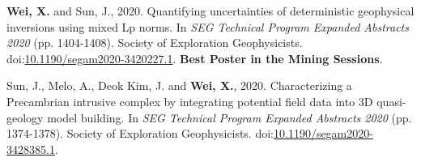 \documentclass[11pt, a4paper]{article}
\newcommand{\LastName}{Wei}
\newcommand{\Initials}{X}
\newcommand{\Wei}{\textbf{\LastName, \Initials.}}  %
\newcommand{\WeiSun}{\textbf{\LastName, \Initials.} and Sun, J.}  %
\newcommand{\DOI}[1]{doi:\href{https://doi.org/#1}{#1}}
\begin{document}
\begin{etaremune}
	\item
	\WeiSun, 2020. Quantifying uncertainties of deterministic geophysical inversions using mixed Lp norms. In \emph{SEG Technical Program Expanded Abstracts 2020} (pp. 1404-1408). Society of Exploration Geophysicists. \DOI{10.1190/segam2020-3420227.1}. \textbf{Best Poster in the Mining Sessions}.

	\item
	Sun, J., Melo, A., Deok Kim, J. and \Wei, 2020. Characterizing a Precambrian intrusive complex by integrating potential field data into 3D quasi-geology model building. In \emph{SEG Technical Program Expanded Abstracts 2020} (pp. 1374-1378). Society of Exploration Geophysicists. \DOI{10.1190/segam2020-3428385.1}.

\end{etaremune}
\end{document}
